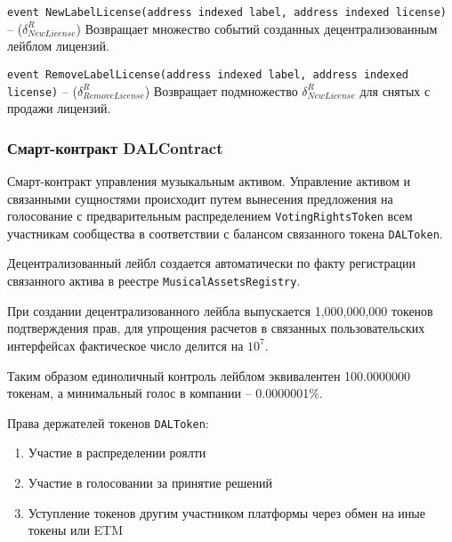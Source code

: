 \documentclass[12pt]{report}
\def\code#1{\colorbox{light-gray}{\texttt{#1}}}
\begin{document}
\code{event NewLabelLicense(address indexed label, address indexed license)} – ($\delta^R_{NewLicense}$)\hfill\null\linebreak
Возвращает множество событий созданных децентрализованным лейблом лицензий.

\code{event RemoveLabelLicense(address indexed label, address indexed license)} – ($\delta^R_{RemoveLicense}$)\hfill\null\linebreak
Возвращает подмножество $\delta^R_{NewLicense}$ для снятых с продажи лицензий.

\subsubsection{Смарт-контракт DALContract}
\label{tech-apps-dal-label}
\begin{multicols}{2}
Смарт-контракт управления музыкальным активом. Управление активом и связанными сущностями происходит путем вынесения предложения на голосование с предварительным распределением \code{VotingRightsToken} всем участникам сообщества в соответствии с балансом связанного токена \code{DALToken}.
 
Децентрализованный лейбл создается автоматически по факту регистрации связанного актива в реестре \code{MusicalAssetsRegistry}.

При создании децентрализованного лейбла выпускается 1,000,000,000 токенов подтверждения прав, для упрощения расчетов в связанных пользовательских интерфейсах фактическое число делится на $10^7$. 

Таким образом единоличный контроль лейблом эквивалентен 100.0000000 токенам, а минимальный голос в компании – 0.0000001\%.

Права держателей токенов \code{DALToken}:
\begin{enumerate}
	\item Участие в распределении роялти
	\item Участие в голосовании за принятие решений 
	\item Уступление токенов другим участником платформы через обмен на иные токены или ETM
\end{enumerate}
\end{multicols}
\end{document}
